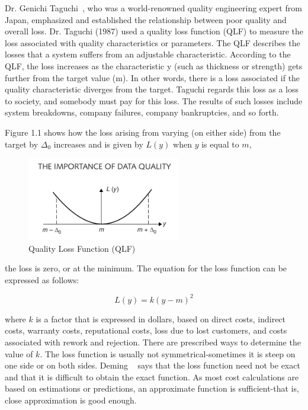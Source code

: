 Dr. Genichi Taguchi~\citep{Jugulum14}, who was a world-renowned quality engineering expert from Japan, emphasized and established the relationship between
poor quality and overall loss. Dr. Taguchi (1987) used a quality loss function (QLF) to measure the loss associated with quality characteristics
or parameters. The QLF describes the losses that a system suffers from an adjustable characteristic. According to the QLF, the loss increases as
the characteristic y (such as thickness or strength) gets further from the target value (m). In other words, there is a loss associated if the quality
characteristic diverges from the target. Taguchi regards this loss as a loss to society, and somebody must pay for this loss. The results of such losses
include system breakdowns, company failures, company bankruptcies, and so forth.

Figure 1.1 shows how the loss arising from varying (on either side)
from the target by $\Delta_0$ increases and is given by $L(y)$ when $y$ is equal to $m$,

\begin{figure}[htbp!] 
\centering    
\includegraphics[width=0.6\textwidth]{quality-loss-function}
\caption{Quality Loss Function (QLF)}
\end{figure}

the loss is zero, or at the minimum. The equation for the loss function can
be expressed as follows:

\begin{equation*}
    L(y) = k(y-m)^2
\end{equation*}

where $k$ is a factor that is expressed in dollars, based on direct costs, indirect costs, 
warranty costs, reputational costs, loss due to lost customers,
and costs associated with rework and rejection. There are prescribed ways
to determine the value of $k$.
The loss function is usually not symmetrical-sometimes it is steep on
one side or on both sides. Deming ~\citep{Deming} says that the loss function need
not be exact and that it is difficult to obtain the exact function. As most
cost calculations are based on estimations or predictions, an approximate
function is sufficient-that is, close approximation is good enough.

